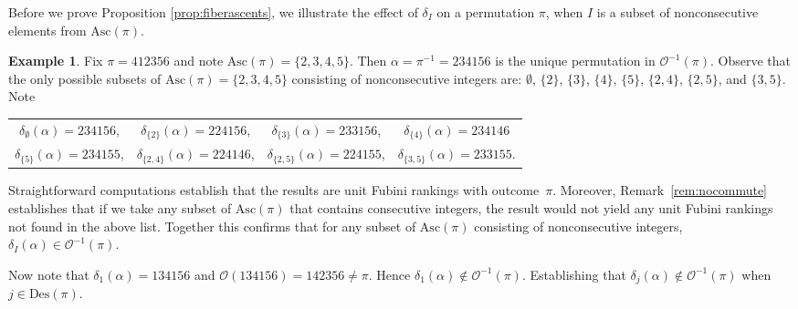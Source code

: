 \documentclass[11pt,reqno]{amsart}
\newcommand*{\Out}{\mathcal{O}}
\newcommand{\Asc}{\mathrm{Asc}}
\newcommand{\Des}{\mathrm{Des}}
\theoremstyle{definition}
\newtheorem{example}{Example}[section]
\theoremstyle{notation}
\theoremstyle{openproblem}
\begin{document}
Before we prove Proposition \ref{prop:fiberascents}, we illustrate the effect of $\delta_I$ on a permutation $\pi$, when $I$ is a subset of nonconsecutive elements from $\Asc(\pi)$.
\begin{example}
    Fix $\pi = 412356$ and note  $\Asc(\pi) = \{2,3,4,5 \}$. Then $\alpha=\pi^{-1} = 234156$ is the  unique permutation in $\Out^{-1}(\pi)$. 
    Observe that the only possible subsets   of $\Asc(\pi)=\{2,3,4,5\}$ consisting of nonconsecutive integers are: $\emptyset$, $\{2\}$, $\{3\}$, $\{4\}$, $\{5\}$, $\{2,4\}$, $\{2,5\}$, and $\{3,5\}$. Note     \begin{center}\begin{tabular}{cccc}
            $\delta_{\emptyset}(\alpha)=234156$,&
$            \delta_{\{2\}}(\alpha)=224156 $,&
            $\delta_{\{3\}}(\alpha)= 233156$,&
 $           \delta_{\{4\}}(\alpha)=234146$\\
 
            $\delta_{\{5\}}(\alpha)=234155$,&
            $\delta_{\{2,4\}}(\alpha)=224146$,&
            $\delta_{\{2,5\}}(\alpha)=224155$,&
            $\delta_{\{3,5\}}(\alpha)=233155$.
        \end{tabular}
        \end{center}
        Straightforward computations establish that the results are unit Fubini rankings with outcome~$\pi$.
        Moreover, Remark~\ref{rem:nocommute} establishes that if we take any subset of $\Asc(\pi)$ that contains consecutive integers, 
        the result would not yield any unit Fubini rankings not found in the above list. 
        Together this confirms that for any subset of $\Asc(\pi)$ consisting of nonconsecutive integers, $\delta_I(\alpha)\in \Out^{-1}(\pi)$. 

    Now note that $\delta_1(\alpha)=134156$ and $\Out(134156)=142356\neq \pi$. Hence $\delta_1(\alpha)\notin \Out^{-1}(\pi)$. Establishing that  $\delta_j(\alpha)\notin\Out^{-1}(\pi)$ when $j\in \Des(\pi)$.
\end{example}
\end{document}
